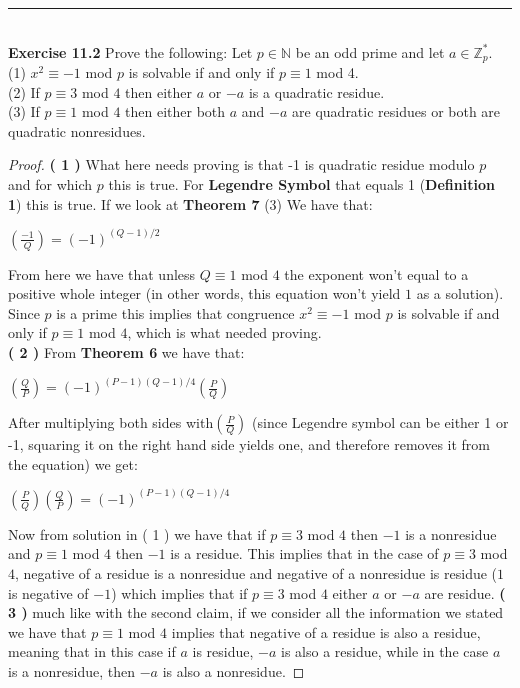 \documentclass[a4paper]{article}
\begin{document}
\noindent\rule{12cm}{0.4pt}\\
\noindent \textbf{Exercise 11.2} Prove the following: Let $p \in \mathbb{N}$ be an odd prime and let $a \in \mathbb{Z}^{*}_{p}$.\\
(1) $ x^{2} \equiv -1$ mod $p$ is solvable if and only if $p \equiv 1$ mod 4.\\
(2) If $p \equiv 3$ mod $4$ then either $a$ or $-a$ is a quadratic residue.\\
(3) If $p \equiv 1$ mod $4$ then either both $a$ and $-a$ are quadratic residues or both are quadratic nonresidues.
\begin{proof}
\textbf{( 1 )} What here needs proving is that -1 is quadratic residue modulo $p$ and for which $p$ this is true. For \textbf{Legendre Symbol} that equals 1 (\textbf{Definition 1}) this is true. If we look at \textbf{Theorem 7} (3) We have that:
\begin{center}
$\left(\frac{-1}{Q}\right) = (-1)^{(Q-1)/2}$
\end{center}
From here we have that unless $Q \equiv 1$ mod $4$ the exponent won't equal to a positive whole integer (in other words, this equation won't yield $1$ as a solution). Since $p$ is a prime this implies that congruence $x^{2} \equiv -1$ mod $p$ is solvable if and only if $p \equiv 1$ mod $4$, which is what needed proving. \\
\textbf{( 2 )} From \textbf{Theorem 6} we have that:
\begin{center}
$\left(\frac{Q}{P}\right) = (-1)^{(P-1)(Q-1)/4}\left(\frac{P}{Q}\right)$
\end{center}
After multiplying both sides with$\left(\frac{P}{Q}\right)$ (since Legendre symbol can be either 1 or -1, squaring it on the right hand side yields one, and therefore removes it from the equation) we get:
\begin{center}
$\left(\frac{P}{Q}\right)\left(\frac{Q}{P}\right) = (-1)^{(P-1)(Q-1)/4}$
\end{center}
Now from solution in ( 1 ) we have that if $p \equiv 3$ mod $4$ then $-1$ is a nonresidue and $p \equiv 1$ mod $4$ then $-1$ is a residue. This implies that in the case of $p \equiv 3$ mod $4$, negative of a residue is a nonresidue and negative of a nonresidue is residue ($1$ is negative of $-1$) which implies that if $p \equiv 3$ mod $4$ either $a$ or $-a$ are residue.
\textbf{( 3 )} much like with the second claim, if we consider all the information we stated we have that $p \equiv 1$ mod $4$ implies that negative of a residue is also a residue, meaning that in this case if $a$ is residue, $-a$ is also a residue, while in the case $a$ is a nonresidue, then $-a$ is also a nonresidue.
\end{proof}
\end{document}
